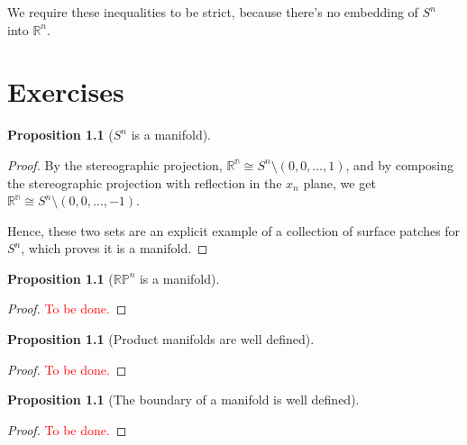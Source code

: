 \documentclass[12pt]{report}
\theoremstyle{definition}
\newtheorem{prop}[thm]{Proposition}
\newcommand{\bb}[1]{\mathbb{#1}}
\begin{document}
We require these inequalities to be strict, because there's no embedding of $S^n$ into $\bb{R}^n$.


\chapter{Exercises}

\begin{prop}[$S^n$ is a manifold]
\label{snmanifold}
\end{prop}
\begin{proof}
By the stereographic projection, $\bb{R^n} \cong S^n \setminus (0, 0, \dots, 1)$, and by composing the stereographic projection with reflection in the $x_n$ plane, we get $\bb{R^n} \cong S^n \setminus (0, 0, \dots, -1)$.

Hence, these two sets are an explicit example of a collection of surface patches for $S^n$, which proves it is a manifold.
\end{proof}

\begin{prop}[$\bb{RP}^n$ is a manifold]
\label{rpnmanifold}
\end{prop}
\begin{proof}
\textcolor{red}{To be done.}
\end{proof}

\begin{prop}[Product manifolds are well defined]
\label{productmanifold}
\end{prop}
\begin{proof}
\textcolor{red}{To be done.}
\end{proof}

\begin{prop}[The boundary of a manifold is well defined]
\label{manifoldwboundary}
\end{prop}
\begin{proof}
\textcolor{red}{To be done.}
\end{proof}
\end{document}
